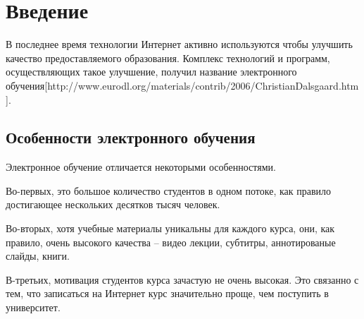 \documentclass{matmex-diploma-custom}
\begin{document}
\maketitle
\tableofcontents
\section*{Введение}

В последнее время технологии Интернет активно используются чтобы
улучшить качество предоставляемого образования. Комплекс технологий и
программ, осуществляющих такое улучшение, получил название
электронного
обучения[http://www.eurodl.org/materials/contrib/2006/ChristianDalsgaard.htm].

\subsection*{Особенности электронного обучения}
Электронное обучение отличается некоторыми особенностями.

Во-первых, это большое количество студентов в одном потоке, как
правило достигающее нескольких десятков тысяч человек.

Во-вторых, хотя учебные материалы уникальны для каждого курса, они,
как правило, очень высокого качества -- видео лекции, субтитры,
аннотированые слайды, книги.

В-третьих, мотивация студентов курса зачастую не очень высокая. Это
связанно с тем, что записаться на Интернет курс значительно проще, чем
поступить в университет.
\end{document}
